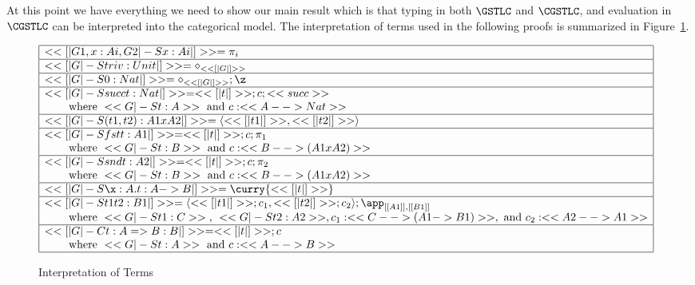 At this point we have everything we need to show our main result which
is that typing in both $\GSTLC$ and $\CGSTLC$, and evaluation in
$\CGSTLC$ can be interpreted into the categorical model.  The
interpretation of terms used in the following proofs is summarized in
Figure~\ref{fig:interp-terms}.
\begin{figure}
  \small  
    \begin{center}
      \begin{math}
          \begin{array}{|l|}
            \hline
            << [| G1 , x : Ai , G2 |-S x : Ai |] >> = \pi_i\\
            \hline
            << [| G |-S triv : Unit |] >> = \diamond_{<< [| G |] >>}\\
            \hline
            << [| G |-S 0 : Nat |] >> = \diamond_{<< [| G |] >>};\z\\
            \hline
            << [| G |-S succ t : Nat |] >> = << [| t |] >>;c;<<succ>>\\
            \,\,\,\,\,\,\,\,\,\,\,\text{ where } <<G |-S t : A>>\text{ and }c : <<A --> Nat>>\\
            \hline
            << [| G |-S (t1,t2) : A1 x A2 |] >> = \langle << [| t1 |] >> , << [| t2 |] >> \rangle\\
            \hline
            << [| G |-S fst t : A1 |] >> = << [| t |] >>;c;\pi_1\\
            \,\,\,\,\,\,\,\,\,\,\,\text{ where } <<G |-S t : B>>\text{ and }c : <<B --> (A1 x A2)>>\\
            \hline
            << [| G |-S snd t : A2 |] >> = << [| t |] >>;c;\pi_2\\           
            \,\,\,\,\,\,\,\,\,\,\,\text{ where } <<G |-S t : B>>\text{ and }c : <<B --> (A1 x A2)>>\\
            \hline
            << [| G |-S \x:A.t : A -> B |] >> = \curry{<< [| t |] >>}\\
            \hline
            << [| G |-S t1 t2 : B1 |] >> = \langle << [| t1 |] >>;c_1, << [| t2 |] >>;c_2\rangle;\app_{[[A1]],[[B1]]}\\
            \,\,\,\,\,\,\,\,\,\,\,\text{ where } <<G |-S t1 : C>>\text{, }<<G |-S t2 : A2>>, c_1 : <<C --> (A1 -> B1)>>, \text{ and }c_2 : <<A2 --> A1>>\\
            \hline
            << [| G |-C t : {A} => {B} : B |] >> = << [| t |] >>;c\\
            \,\,\,\,\,\,\,\,\,\,\,\text{ where } <<G |-S t : A>> \text{ and }c : <<A --> B>>\\
            \hline
          \end{array}
      \end{math}
    \end{center}
  \caption{Interpretation of Terms}
  \label{fig:interp-terms}
\end{figure}
